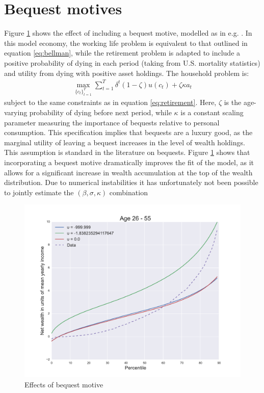 \section{Bequest motives}
Figure \ref{fig:bequests} shows the effect of including a bequest motive, modelled
as in e.g. \citet{KopczukLupton2007}. In this model economy, the working life 
problem is equivalent to that outlined in equation \ref{eq:bellman}, while the
retirement problem is adapted to include a positive probability of dying in 
each period (taking from U.S. mortality statistics) and utility from dying with
positive asset holdings. The household problem is:
\begin{align}\label{eq:retirement_bequest}
\max_{\{c_t\}_{t=1}^{T}} \sum_{t = 1}^{T} \delta^t (1-\zeta)u(c_t) + \zeta \kappa a_t 
\end{align}
subject to the same constraints as in equation \ref{eq:retirement}. 
Here, $\zeta$ is the age-varying probability of dying before next period, while
$\kappa$ is a constant scaling parameter measuring the importance of bequests 
relative to personal consumption. This specification implies that bequests are a 
luxury good, as the marginal utility of leaving a bequest increases in the level 
of wealth holdings. This assumption is standard in the literature on bequests.
Figure \ref{fig:bequests} shows that incorporating a bequest motive dramatically
improves the fit of the model, as it allows for a significant increase in wealth
accumulation at the top of the wealth distribution. Due to numerical instabilities
it has unfortunately not been possible to jointly estimate the $(\beta,\sigma,
\kappa)$ combination  

\begin{figure}
\includegraphics[width=\columnwidth]{bequest_motive}
\caption{Effects of bequest motive}
\label{fig:bequests}
\end{figure}


